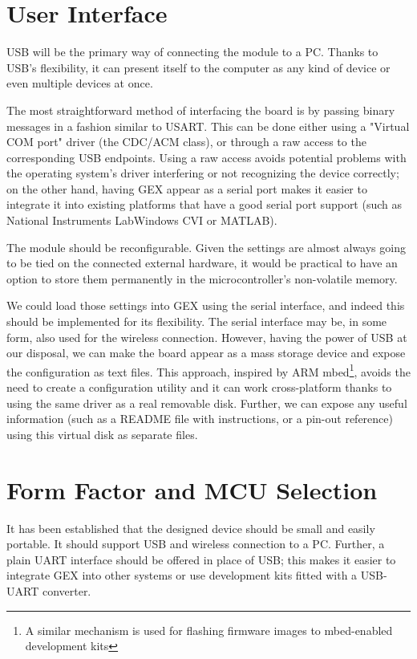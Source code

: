 \section{User Interface}

USB will be the primary way of connecting the module to a PC. Thanks to USB's flexibility, it can present itself to the computer as any kind of device or even multiple devices at once.

The most straightforward method of interfacing the board is by passing binary messages in a fashion similar to USART. This can be done either using a "Virtual COM port" driver (the CDC/ACM class), or through a raw access to the corresponding USB endpoints. Using a raw access avoids potential problems with the operating system's driver interfering or not recognizing the device correctly; on the other hand, having GEX appear as a serial port makes it easier to integrate it into existing platforms that have a good serial port support (such as National Instruments LabWindows CVI or MATLAB).

The module should be reconfigurable. Given the settings are almost always going to be tied on the connected external hardware, it would be practical to have an option to store them permanently in the microcontroller's non-volatile memory.

We could load those settings into GEX using the serial interface, and indeed this should be implemented for its flexibility. The serial interface may be, in some form, also used for the wireless connection. However, having the power of USB at our disposal, we can make the board appear as a mass storage device and expose the configuration as text files. This approach, inspired by ARM mbed\footnote{A similar mechanism is used for flashing firmware images to mbed-enabled development kits}, avoids the need to create a configuration utility and it can work cross-platform thanks to using the same driver as a real removable disk. Further, we can expose any useful information (such as a README file with instructions, or a pin-out reference) using this virtual disk as separate files.

\section{Form Factor and MCU Selection}

It has been established that the designed device should be small and easily portable. It should support USB and wireless connection to a PC. Further, a plain UART interface should be offered in place of USB; this makes it easier to integrate GEX into other systems or use development kits fitted with a USB-UART converter.

